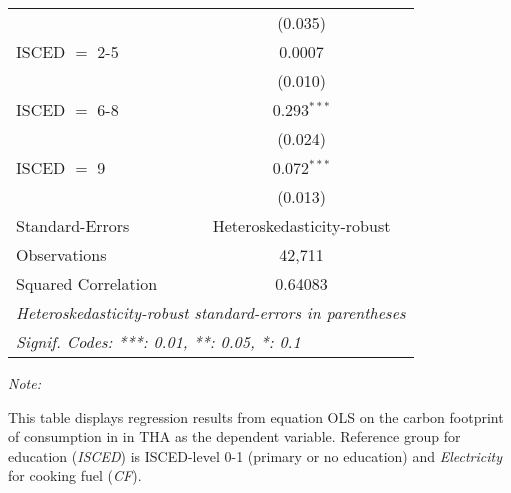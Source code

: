 \begin{table}[htbp!]
\begin{adjustbox}{width = 1\textwidth, max height = 0.95\textheight, center}
\begin{threeparttable}[b]
\begin{tabular}{lc}
                                & (0.035)\\   
            ISCED $=$ 2-5       & 0.0007\\   
                                & (0.010)\\   
            ISCED $=$ 6-8       & 0.293$^{***}$\\   
                                & (0.024)\\   
            ISCED $=$ 9         & 0.072$^{***}$\\   
                                & (0.013)\\   
            \midrule 
            Standard-Errors     & Heteroskedasticity-robust \\   
            Observations        & 42,711\\  
            Squared Correlation & 0.64083\\  
            \midrule \midrule
            \multicolumn{2}{l}{\emph{Heteroskedasticity-robust standard-errors in parentheses}}\\
            \multicolumn{2}{l}{\emph{Signif. Codes: ***: 0.01, **: 0.05, *: 0.1}}\\
         \end{tabular}
         
         \begin{tablenotes}\item \medskip \textit{Note:}
            \item This table displays regression results from equation OLS on the carbon footprint of consumption in  in THA as the dependent variable.  Reference group for education (\textit{ISCED}) is ISCED-level 0-1 (primary or no education) and \textit{Electricity} for cooking fuel (\textit{CF}).
         \end{tablenotes}
      \end{threeparttable}
   \end{adjustbox}
\end{table}


